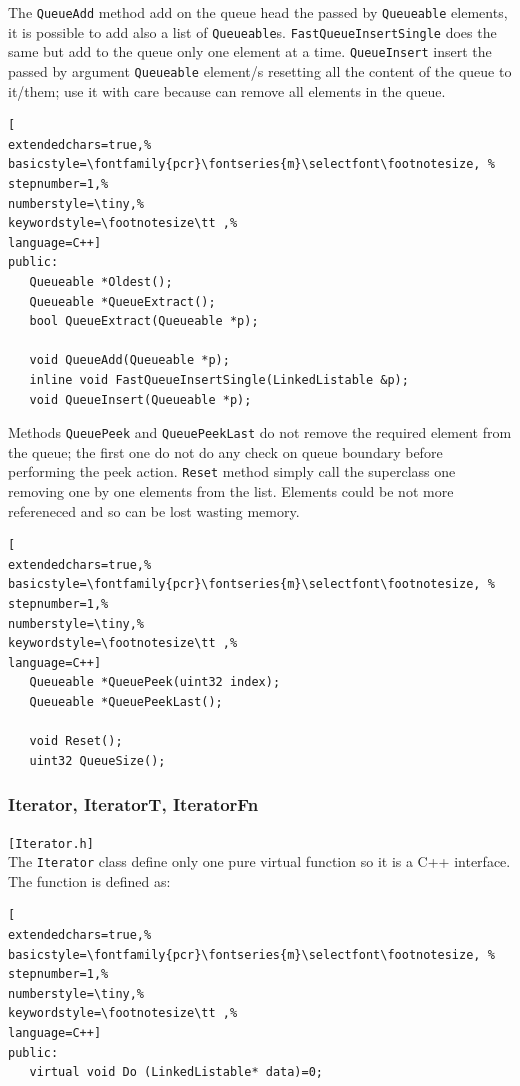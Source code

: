 The \texttt{QueueAdd} method add on the queue head the passed by \texttt{Queueable} elements, it is possible to add also a list of \texttt{Queueable}s. \texttt{FastQueueInsertSingle} does the same but add to the queue only one element at a time.
\texttt{QueueInsert} insert the passed by argument \texttt{Queueable} element/s resetting all the content of the queue to it/them; use it with care because can remove all elements in the queue.

\begin{lstlisting}[
extendedchars=true,%
basicstyle=\fontfamily{pcr}\fontseries{m}\selectfont\footnotesize, %
stepnumber=1,%
numberstyle=\tiny,%
keywordstyle=\footnotesize\tt ,%
language=C++]
public:
   Queueable *Oldest();
   Queueable *QueueExtract();
   bool QueueExtract(Queueable *p);

   void QueueAdd(Queueable *p); 
   inline void FastQueueInsertSingle(LinkedListable &p);
   void QueueInsert(Queueable *p);
\end{lstlisting}

Methods \texttt{QueuePeek} and \texttt{QueuePeekLast} do not remove the required element from the queue; the first one do not do any check on queue boundary before performing the peek action.
\texttt{Reset} method simply call the superclass one removing one by one elements from the list. Elements could be not more refereneced and so can be lost wasting memory.

\begin{lstlisting}[
extendedchars=true,%
basicstyle=\fontfamily{pcr}\fontseries{m}\selectfont\footnotesize, %
stepnumber=1,%
numberstyle=\tiny,%
keywordstyle=\footnotesize\tt ,%
language=C++]
   Queueable *QueuePeek(uint32 index);
   Queueable *QueuePeekLast();

   void Reset();
   uint32 QueueSize();
\end{lstlisting}



\subsubsection{Iterator, IteratorT, IteratorFn}
\texttt{[Iterator.h]}\\
The \texttt{Iterator} class define only one pure virtual function so it is a C++ interface. The function is defined as:

\begin{lstlisting}[
extendedchars=true,%
basicstyle=\fontfamily{pcr}\fontseries{m}\selectfont\footnotesize, %
stepnumber=1,%
numberstyle=\tiny,%
keywordstyle=\footnotesize\tt ,%
language=C++]
public:
   virtual void Do (LinkedListable* data)=0;
\end{lstlisting}

